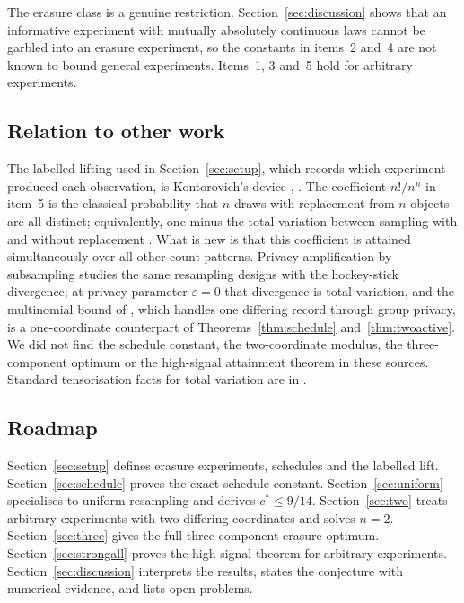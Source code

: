 \documentclass[11pt,a4paper]{article}
\theoremstyle{definition}\newtheorem{definition}[theorem]{Definition}
\theoremstyle{remark}\newtheorem{remark}[theorem]{Remark}
\begin{document}
The erasure class is a genuine restriction. Section~\ref{sec:discussion} shows that an informative experiment with mutually absolutely continuous laws cannot be garbled into an erasure experiment, so the constants in items~2 and~4 are not known to bound general experiments. Items~1, 3 and~5 hold for arbitrary experiments.

\subsection{Relation to other work}
The labelled lifting used in Section~\ref{sec:setup}, which records which experiment produced each observation, is Kontorovich's device \cite[Theorem~3 and proof of Theorem~4]{KApr}, \cite[Proposition~5.3]{KOct}. The coefficient $n!/n^n$ in item~5 is the classical probability that $n$ draws with replacement from $n$ objects are all distinct; equivalently, one minus the total variation between sampling with and without replacement \cite[p.~198, eq.~(1)]{Sampling}. What is new is that this coefficient is attained simultaneously over all other count patterns. Privacy amplification by subsampling studies the same resampling designs with the hockey-stick divergence; at privacy parameter $\varepsilon=0$ that divergence is total variation, and the multinomial bound of \cite[Theorem~10]{BBG}, which handles one differing record through group privacy, is a one-coordinate counterpart of Theorems~\ref{thm:schedule} and~\ref{thm:twoactive}. We did not find the schedule constant, the two-coordinate modulus, the three-component optimum or the high-signal attainment theorem in these sources. Standard tensorisation facts for total variation are in \cite{KTen}.

\subsection{Roadmap}
Section~\ref{sec:setup} defines erasure experiments, schedules and the labelled lift. Section~\ref{sec:schedule} proves the exact schedule constant. Section~\ref{sec:uniform} specialises to uniform resampling and derives $c^*\le9/14$. Section~\ref{sec:two} treats arbitrary experiments with two differing coordinates and solves $n=2$. Section~\ref{sec:three} gives the full three-component erasure optimum. Section~\ref{sec:strongall} proves the high-signal theorem for arbitrary experiments. Section~\ref{sec:discussion} interprets the results, states the conjecture with numerical evidence, and lists open problems.
\end{document}
